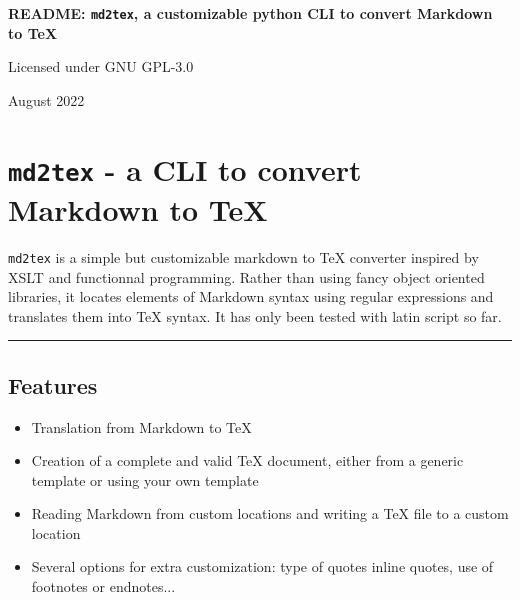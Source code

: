 \documentclass[a4paper, 12pt, twoside]{book}
\begin{document}
	\onehalfspacing

	\begin{titlepage}
		\begin{center}
			\hspace{0pt}

			\vfill

			\begin{Huge}
				\textbf{README: \texttt{md2tex}, a customizable python CLI to convert Markdown to TeX}
			\end{Huge}

			\vfill

			\begin{large}
				Licensed under GNU GPL-3.0

				\bigskip

				August 2022
			\end{large}
		\end{center}
	\end{titlepage}

\chapter*{\texttt{md2tex} - a CLI to convert Markdown to TeX}

\texttt{md2tex} is a simple but customizable markdown to TeX converter inspired by XSLT and functionnal programming. 
Rather than using fancy object oriented libraries, it locates elements of Markdown syntax using regular 
expressions and translates them into TeX syntax. It has only been tested with latin script so far.

\par\noindent\rule{\linewidth}{0.4pt}
\section*{Features}

\begin{itemize}
\item Translation from Markdown to TeX
\item Creation of a complete and valid TeX document, either from a generic template or using your own template
\item Reading Markdown from custom locations and writing a TeX file to a custom location
\item Several options for extra customization: type of quotes inline quotes, use of footnotes or endnotes... 
\end{itemize}
\end{document}
